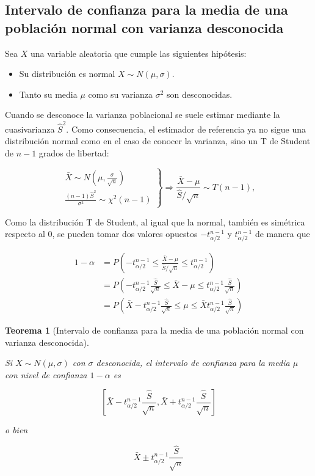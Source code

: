 \documentclass[
  a4paper,
]{scrreport}
\providecommand{\tightlist}{%
  \setlength{\itemsep}{0pt}\setlength{\parskip}{0pt}}\usepackage{longtable,booktabs,array}
\theoremstyle{plain}
\newtheorem{theorem}{Teorema}[chapter]
\theoremstyle{definition}
\theoremstyle{definition}
\theoremstyle{remark}
\begin{document}
\subsection{Intervalo de confianza para la media de una población normal
con varianza
desconocida}\label{intervalo-de-confianza-para-la-media-de-una-poblaciuxf3n-normal-con-varianza-desconocida}

Sea \(X\) una variable aleatoria que cumple las siguientes hipótesis:

\begin{itemize}
\tightlist
\item
  Su distribución es normal \(X\sim N(\mu,\sigma)\).
\item
  Tanto su media \(\mu\) como su varianza \(\sigma^2\) son desconocidas.
\end{itemize}

Cuando se desconoce la varianza poblacional se suele estimar mediante la
cuasivarianza \(\hat{S}^2\). Como consecuencia, el estimador de
referencia ya no sigue una distribución normal como en el caso de
conocer la varianza, sino un T de Student de \(n-1\) grados de libertad:

\[
\left.
\begin{array}{l}
\bar X \sim N\left(\mu,\frac{\sigma}{\sqrt{n}}\right)\\
\displaystyle\frac{(n-1)\hat{S}^2}{\sigma^2}\sim \chi^2(n-1)
\end{array}
\right\}
\Rightarrow
\frac{\bar X -\mu}{\hat{S}/\sqrt{n}}\sim T(n-1),
\]

Como la distribución T de Student, al igual que la normal, también es
simétrica respecto al 0, se pueden tomar dos valores opuestos
\(-t^{n-1}_{\alpha/2}\) y \(t^{n-1}_{\alpha/2}\) de manera que

\begin{align*}
1-\alpha 
&= P\left(-t^{n-1}_{\alpha/2}\leq \frac{\bar X -\mu}{\hat{S}/\sqrt{n}} \leq t^{n-1}_{\alpha/2}\right)\\
&= P\left(-t^{n-1}_{\alpha/2}\frac{\hat{S}}{\sqrt{n}}\leq \bar X -\mu \leq t^{n-1}_{\alpha/2}\frac{\hat{S}}{\sqrt{n}}\right)\\
&= P\left(\bar X-t^{n-1}_{\alpha/2}\frac{\hat{S}}{\sqrt{n}}\leq \mu \leq \bar X t^{n-1}_{\alpha/2}\frac{\hat{S}}{\sqrt{n}}\right)
\end{align*}

\begin{theorem}[Intervalo de confianza para la media de una población
normal con varianza
desconocida]\protect\hypertarget{thm-intervalo-confianza-media-normal-varianza-desconocida}{}\label{thm-intervalo-confianza-media-normal-varianza-desconocida}

Si \(X\sim N(\mu, \sigma)\) con \(\sigma\) desconocida, el
\emph{intervalo de confianza para la media} \(\mu\) con nivel de
confianza \(1-\alpha\) es

\[
\left[\bar{X}-t^{n-1}_{\alpha/2}\frac{\hat{S}}{\sqrt{n}},\bar{X}+t^{n-1}_{\alpha/2}\frac{\hat{S}}{\sqrt{n}}\right]
\]

o bien

\[
\bar{X}\pm t^{n-1}_{\alpha/2}\frac{\hat{S}}{\sqrt{n}}
\]

\end{theorem}
\end{document}
